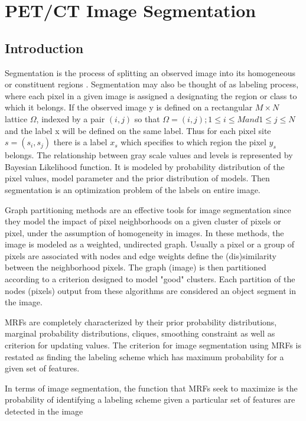 \section{PET/CT Image Segmentation}

\subsection{Introduction}
Segmentation is the process of splitting an observed image into its homogeneous or constituent regions . Segmentation may also be thought of as labeling process, where each pixel in a given image is assigned a designating the region or class to which it belongs. If the observed image y is defined on a rectangular $M \times N$ lattice $\Omega$, indexed  by a pair $(i,j)$ so that \(\Omega = {(i,j); 1\leq i\leq M  and  1 \leq j \leq N}\) and the label x will be defined on the same label. Thus for each pixel site $s=(s_i,s_j)$ there is a label $x_s$ which specifies to which region the pixel $y_s$ belongs. The relationship between  gray scale values and levels is represented by Bayesian Likelihood function.  It is modeled by probability distribution of the pixel values, model parameter and the prior distribution of models. Then segmentation is an optimization problem  of the labels on entire image\cite{barker1998image}.

Graph partitioning methods are an effective tools for image segmentation since they model the impact of pixel neighborhoods on a given cluster of pixels or pixel, under the assumption of homogeneity in images. In these methods, the image is modeled as a weighted, undirected graph. Usually a pixel or a group of pixels are associated with nodes and edge weights define the (dis)similarity between the neighborhood pixels. The graph (image) is then partitioned according to a criterion designed to model "good" clusters. Each partition of the nodes (pixels) output from these algorithms are considered an object segment in the image.\par
MRFs are completely characterized by their prior probability distributions, marginal probability distributions, cliques, smoothing constraint as well as criterion for updating values. The criterion for image segmentation using MRFs is restated as finding the labeling scheme which has maximum probability for a given set of features. \par

In terms of image segmentation, the function that MRFs seek to maximize is the probability of identifying a labeling scheme given a particular set of features are detected in the image


